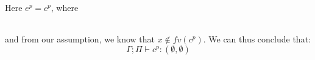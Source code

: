 \item[\runa{T-Const}] Here $e^p=c^p$, where
\begin{figure}[H]
	\setlength\tabcolsep{8pt}
	\begin{tabular}{l}
		
	\end{tabular}
\end{figure}
and from our assumption, we know that $x\notin fv(c^p)$.
We can thus conclude that:
$$\Gamma;\Pi\vdash c^p : (\emptyset,\emptyset)$$
